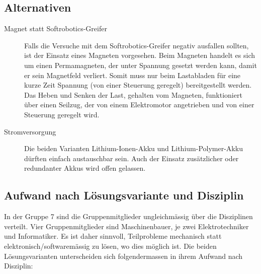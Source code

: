 \documentclass[a4paper,11pt]{scrartcl}
\begin{document}
\subsection{Alternativen}

\begin{description}
    \item [Magnet statt Softrobotics-Greifer] Falls die Versuche mit dem Softrobotics-Greifer negativ ausfallen sollten, ist der Einsatz eines Magneten vorgesehen. Beim Magneten handelt es sich um einen Permamagneten, der unter Spannung gesetzt werden kann, damit er sein Magnetfeld verliert. Somit muss nur beim Lastabladen für eine kurze Zeit Spannung (von einer Steuerung geregelt) bereitgestellt werden. Das Heben und Senken der Last, gehalten vom Magneten, funktioniert über einen Seilzug, der von einem Elektromotor angetrieben und von einer Steuerung geregelt wird.
    \item [Stromversorgung] Die beiden Varianten Lithium-Ionen-Akku und Lithium-Polymer-Akku dürften einfach austauschbar sein. Auch der Einsatz zusätzlicher oder redundanter Akkus wird offen gelassen.
\end{description}

\subsection{Aufwand nach Lösungsvariante und Disziplin}

In der Gruppe 7 sind die Gruppenmitglieder ungleichmässig über die Disziplinen verteilt. Vier Gruppenmitglieder sind Maschinenbauer, je zwei Elektrotechniker und Informatiker. Es ist daher sinnvoll, Teilprobleme mechanisch statt elektronisch/softwaremässig zu lösen, wo dies möglich ist. Die beiden Lösungsvarianten unterscheiden sich folgendermassen in ihrem Aufwand nach Disziplin:
\end{document}

